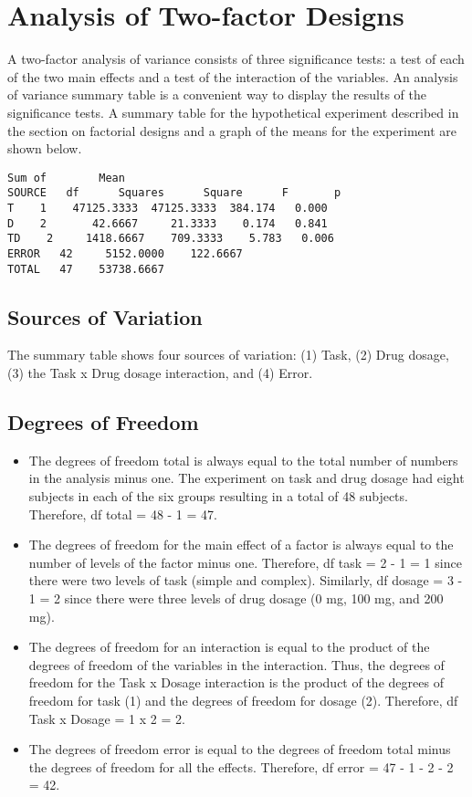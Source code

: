 \section{Analysis of Two-factor Designs}

A two-factor analysis of variance consists of three significance tests: a test of each of the two main effects and a test of the interaction of the variables. An analysis of variance summary table is a convenient way to display the results of the significance tests. A summary table for the hypothetical experiment described in the section on factorial designs and a graph of the means for the experiment are shown below.

\begin{verbatim}
Sum of        Mean
SOURCE   df      Squares      Square      F       p
T    1    47125.3333  47125.3333  384.174   0.000
D    2       42.6667     21.3333    0.174   0.841
TD    2     1418.6667    709.3333    5.783   0.006
ERROR   42     5152.0000    122.6667
TOTAL   47    53738.6667
\end{verbatim}

\subsection{Sources of Variation}

The summary table shows four sources of variation: (1) Task, (2) Drug dosage, (3) the Task x Drug dosage interaction, and (4) Error.

\subsection{Degrees of Freedom}

\begin{itemize}
	\item The degrees of freedom total is always equal to the total number of numbers in the analysis minus one. The experiment on task and drug dosage had eight subjects in each of the six groups resulting in a total of 48 subjects. Therefore, df total = 48 - 1 = 47.
	
	\item The degrees of freedom for the main effect of a factor is always equal to the number of levels of the factor minus one. Therefore, df task = 2 - 1 = 1 since there were two levels of task (simple and complex). Similarly, df dosage = 3 - 1 = 2 since there were three levels of drug dosage (0 mg, 100 mg, and 200 mg).
	
	\item The degrees of freedom for an interaction is equal to the product of the degrees of freedom of the variables in the interaction. Thus, the degrees of freedom for the Task x Dosage interaction is the product of the degrees of freedom for task (1) and the degrees of freedom for dosage (2). Therefore, df Task x Dosage = 1 x 2 = 2.
	
	\item The degrees of freedom error is equal to the degrees of freedom total minus the degrees of freedom for all the effects. Therefore, df error = 47 - 1 - 2 - 2 = 42.
\end{itemize}

